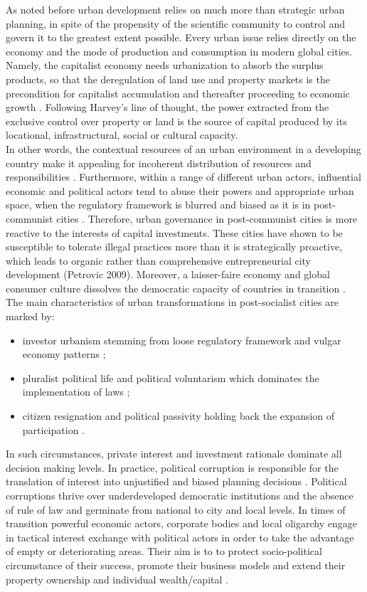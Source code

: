 \documentclass[11pt]{report}
\begin{document}
As noted before urban development relies on much more than strategic urban planning, in spite of the propensity of the scientific community to control and govern it to the greatest extent possible. Every urban issue relies directly on the economy and the mode of production and consumption in modern global cities.
Namely, the capitalist economy needs urbanization to absorb the surplus products, so that the deregulation of land use and property markets is the precondition for capitalist accumulation and thereafter proceeding to economic growth \cite{(Harvey 2012)}. Following Harvey’s line of thought, the power extracted from the exclusive control over property or land is the source of capital produced by its locational, infrastructural, social or cultural capacity.
\\
In other words, the contextual resources of an urban environment in a developing country make it appealing for incoherent distribution of resources and responsibilities \cite{(Bolay et al. 2005)}. Furthermore, within a range of different urban actors, influential economic and political actors tend to abuse their powers and appropriate urban space, when the regulatory framework is blurred and biased as it is in post-communist cities \cite{(Djokic et al. 2007)}. 
Therefore, urban governance in post-communist cities is more reactive to the interests of capital investments.  These cities have shown to be susceptible to tolerate illegal practices more than it is strategically proactive, which leads to organic rather than comprehensive entrepreneurial city development (Petrovic 2009). Moreover, a laisser-faire economy and global consumer culture  dissolves the democratic capacity of countries in transition \cite{(Ellin 1999)}. The main characteristics of urban transformations in post-socialist cities are marked by:
\begin{itemize}
\item investor urbanism stemming from loose regulatory framework and vulgar economy patterns \cite{(Vujosevic 2010)};
\item pluralist political life and political voluntarism which dominates the implementation of laws \cite{(Djokic et al. 2007)};
\item citizen resignation and political passivity holding back the expansion of participation \cite{(Vujovic and Petrovic 2007)}.
\end{itemize}

In such circumstances, private interest and investment rationale dominate all decision making levels. In practice, political corruption is responsible for the translation of interest into unjustified and biased planning decisions 
\cite{adjustment of planning practice nedovic budic 2001}. Political corruptions thrive over underdeveloped democratic institutions and the absence of rule of  law  and germinate from national to city and local levels. In times of transition powerful economic actors, corporate bodies and local oligarchy engage in tactical interest exchange with political actors in order to take the advantage of empty or deteriorating areas. Their aim is to to protect socio-political circumstance of their success, promote their business models and extend their property ownership and individual  wealth/capital \cite{Lazarevic Bajec 2009}.
\end{document}
